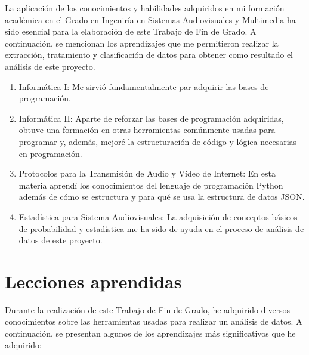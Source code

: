 \documentclass[a4paper, 12pt]{book}
\begin{document}
La aplicación de los conocimientos y habilidades adquiridos en mi formación académica en el Grado en Ingeniría en Sistemas Audiovisuales y Multimedia ha sido esencial para la elaboración de este Trabajo de Fin de Grado.
A continuación, se mencionan los aprendizajes que me permitieron realizar la extracción, tratamiento y clasificación de datos para obtener como resultado el análisis de este proyecto. 

\begin{enumerate}
  \item Informática I: Me sirvió fundamentalmente par adquirir las bases de programación.
  \item Informática II: Aparte de reforzar las bases de programación adquiridas, obtuve una formación en otras herramientas comúnmente usadas para programar y, además, mejoré la estructuración de código y lógica necesarias en programación.
  \item Protocolos para la Transmisión de Audio y Vídeo de Internet: En esta materia aprendí los conocimientos del lenguaje de programación Python además de cómo se estructura y para qué se usa la estructura de datos JSON.
  \item Estadística para Sistema Audiovisuales: La adquisición de conceptos básicos de probabilidad y estadística me ha sido de ayuda en el proceso de análisis de datos de este proyecto. 
\end{enumerate}


\section{Lecciones aprendidas}
\label{sec:lecciones_aprendidas}

Durante la realización de este Trabajo de Fin de Grado, he adquirido diversos conocimientos sobre las herramientas usadas para realizar un análisis de datos. 
A continuación, se presentan algunos de los aprendizajes más significativos que he adquirido:
\end{document}

